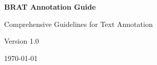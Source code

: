 
\begin{titlepage}
\centering
\vspace*{2cm}

{\Huge\bfseries BRAT Annotation Guide}

\vspace{1cm}

{\Large Comprehensive Guidelines for Text Annotation}

\vspace{2cm}

{\large Version 1.0}

\vfill

{\large \today}

\end{titlepage}